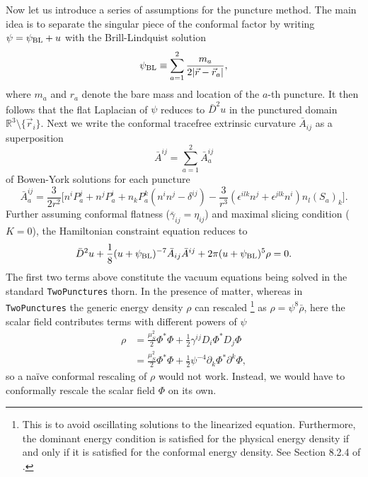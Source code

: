 Now let us introduce a series of assumptions for the puncture method.
The main idea is to separate the singular piece of the conformal factor by writing
$ \psi = \psi_{\rm BL} + u $
with the Brill-Lindquist solution
\begin{equation}
    \psi_{\rm BL} \equiv \sum_{a=1}^2 \frac{m_a}{2|\vec{r} - \vec{r}_a|},
\end{equation}
where $m_a$ and $r_a$ denote the bare mass and location of the $a$-th puncture.
It then follows that the flat Laplacian of $\psi$ reduces to $\bar{D}^2 u$ in the punctured domain
$\mathbb{R}^3\setminus\{\vec{r}_i\}$.
Next we write the conformal tracefree extrinsic curvature $\bar{A}_{ij}$ as a superposition
\begin{equation}
    \bar{A}^{ij} = \sum_{a=1}^2 \bar{A}_a^{ij}
\end{equation}
of Bowen-York solutions for each puncture
\begin{equation}
    \bar{A}_a^{ij} = \frac{3}{2r^2} \Big[
        n^i P_a^j + n^j P_a^i + n_k P_a^k (n^i n^j - \delta^{ij})
        - \frac{3}{r^3} (\epsilon^{ilk} n^j + \epsilon^{jlk} n^i) n_l {(S_a)}_k
    \Big].
\end{equation}
Further assuming conformal flatness ($\bar{\gamma}_{ij} = \eta_{ij}$) and maximal slicing condition ($K=0$), the Hamiltonian constraint equation reduces to
\begin{equation}
    \bar{D}^2 u + \frac{1}{8} (u+\psi_{\rm BL} )^{-7} \bar{A}_{ij} \bar{A}^{ij}
    + 2\pi (u+\psi_{\rm BL})^5 \rho = 0.
    \label{eq:ham_twopunctures}
\end{equation}
The first two terms above constitute the vacuum equations being solved in the standard \texttt{TwoPunctures} thorn.
In the presence of matter, whereas in \texttt{TwoPunctures} the generic energy density $\rho$ can rescaled
\footnote{
This is to avoid oscillating solutions to the linearized equation.
Furthermore, the dominant energy condition is satisfied for the 
physical energy density if and only if it is satisfied for the conformal energy density.
See Section 8.2.4 of \cite{Gourgoulhon:2007ue}.
} as $\rho = \psi^8 \bar{\rho}$,
here the scalar field contributes terms with different powers of $\psi$
\begin{align}
    \rho
    &= \frac{\mu_S^2}{2} \Phi^* \Phi
    + \frac{1}{2} \gamma^{ij} D_i\Phi^* D_j \Phi
    \nonumber
    \\
    &= \frac{\mu_S^2}{2} \Phi^* \Phi
    + \frac{1}{2} \psi^{-4} \partial_k\Phi^* \partial^k \Phi,
    \label{eq:rho}
\end{align}
so a na\"{i}ve conformal rescaling of $\rho$ would not work.
Instead, we would have to conformally rescale the scalar field $\Phi$ on its own.

